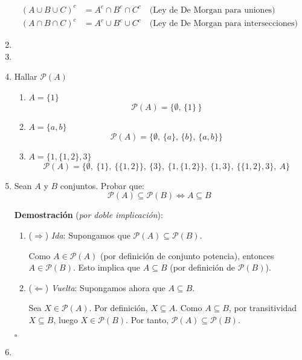 \documentclass{article}
\begin{document}
\begin{enumerate}
        \begin{align*}
        (A \cup B \cup C)^c &= A^c \cap B^c \cap C^c \quad \text{(Ley de De Morgan para uniones)} \\
        (A \cap B \cap C)^c &= A^c \cup B^c \cup C^c \quad \text{(Ley de De Morgan para intersecciones)}
        \end{align*}

    \item 
    \item 
    \item Hallar $\mathcal{P}(A)$
        \begin{enumerate}
            \item $A=\{1\}$
            \[
            \mathcal{P}(A) = \big\{ \emptyset,\, \{1\}\, \big\}
            \]
            \item $A=\{a,b\}$
            \[
            \mathcal{P}(A) = \big\{ \emptyset,\, \{a\},\, \{b\},\, \{a,b\} \big\}
            \]
            \item $A=\{1,\{1,2\},3\}$
            \[
            \mathcal{P}(A) = \Big\{
                \emptyset,\ 
                \{1\},\ 
                \{\{1, 2\}\},\ 
                \{3\},\ 
                \{1, \{1, 2\}\},\ 
                \{1, 3\},\ 
                \{\{1, 2\}, 3\},\ 
                A
            \Big\}
            \]
            
        \end{enumerate}

     \item Sean \( A \) y \( B \) conjuntos. Probar que:
    \[
    \mathcal{P}(A) \subseteq \mathcal{P}(B) \iff A \subseteq B
    \]
    
    \textbf{Demostración} (\textit{por doble implicación}):
    
    \begin{enumerate}[label=\roman*)]
        \item (\(\Rightarrow\)) \textit{Ida}: Supongamos que \( \mathcal{P}(A) \subseteq \mathcal{P}(B) \). 
        
        Como \( A \in \mathcal{P}(A) \) (por definición de conjunto potencia), entonces \( A \in \mathcal{P}(B) \). Esto implica que \( A \subseteq B \) (por definición de \( \mathcal{P}(B) \)).
        
        \item (\(\Leftarrow\)) \textit{Vuelta}: Supongamos ahora que \( A \subseteq B \). 
        
        Sea \( X \in \mathcal{P}(A) \). Por definición, \( X \subseteq A \). Como \( A \subseteq B \), por transitividad \( X \subseteq B \), luego \( X \in \mathcal{P}(B) \). Por tanto, \( \mathcal{P}(A) \subseteq \mathcal{P}(B) \).
    \end{enumerate}
    
    \hfill \(\square\) %


    \item 

\end{enumerate}
    
\end{document}
